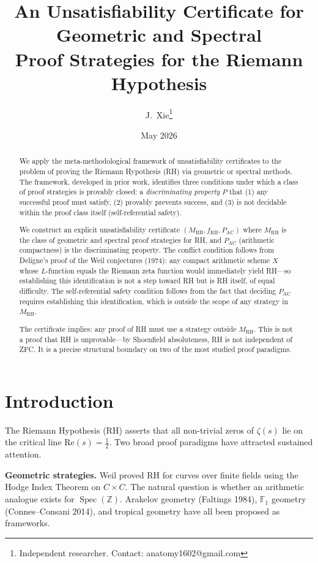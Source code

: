 \documentclass[12pt]{article}
\title{An Unsatisfiability Certificate for Geometric and Spectral\\
Proof Strategies for the Riemann Hypothesis}
\author{J.~Xie\thanks{Independent researcher. Contact: anatomy1602@gmail.com}}
\date{May 2026}
\DeclareMathOperator{\Spec}{Spec}
\newcommand{\ZZ}{\mathbb{Z}}
\begin{document}
\maketitle

\begin{abstract}
We apply the meta-methodological framework of unsatisfiability certificates
to the problem of proving the Riemann Hypothesis (RH) via geometric or
spectral methods. The framework, developed in prior work, identifies three
conditions under which a class of proof strategies is provably closed: a
\emph{discriminating property} $P$ that (1) any successful proof must
satisfy, (2) provably prevents success, and (3) is not decidable within
the proof class itself (self-referential safety).

We construct an explicit unsatisfiability certificate $(M_{\mathrm{RH}},
f_{\mathrm{RH}}, P_{\mathrm{AC}})$ where $M_{\mathrm{RH}}$ is the class
of geometric and spectral proof strategies for RH, and $P_{\mathrm{AC}}$
(arithmetic compactness) is the discriminating property. The conflict
condition follows from Deligne's proof of the Weil conjectures (1974):
any compact arithmetic scheme $X$ whose $L$-function equals the Riemann
zeta function would immediately yield RH---so establishing this
identification is not a step toward RH but is RH itself, of equal
difficulty. The self-referential safety condition follows from the fact
that deciding $P_{\mathrm{AC}}$ requires establishing this identification,
which is outside the scope of any strategy in $M_{\mathrm{RH}}$.

The certificate implies: any proof of RH must use a strategy outside
$M_{\mathrm{RH}}$. This is not a proof that RH is unprovable---by
Shoenfield absoluteness, RH is not independent of ZFC. It is a precise
structural boundary on two of the most studied proof paradigms.
\end{abstract}

\tableofcontents
\newpage

\section{Introduction}
The Riemann Hypothesis (RH) asserts that all non-trivial zeros of
$\zeta(s)$ lie on the critical line $\mathrm{Re}(s) = \tfrac{1}{2}$.
Two broad proof paradigms have attracted sustained attention.

\textbf{Geometric strategies.} Weil proved RH for curves over finite
fields using the Hodge Index Theorem on $C \times C$. The natural
question is whether an arithmetic analogue exists for $\Spec(\ZZ)$.
Arakelov geometry (Faltings 1984), $\mathbb{F}_1$ geometry
(Connes--Consani 2014), and tropical geometry have all been proposed
as frameworks.
\end{document}
